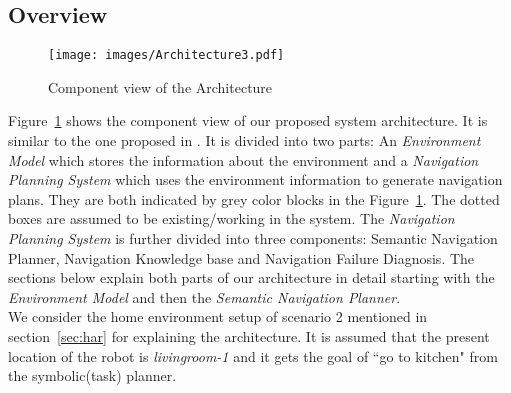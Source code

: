 \subsection{Overview} 
\begin{figure}[htbp] %
   \centering
   \texttt{[image: images/Architecture3.pdf]} 
   \caption{Component view of the Architecture}
   \label{fig:SysArc}
\end{figure}

Figure~\ref{fig:SysArc} shows the component view of our proposed system architecture. It is similar to the one proposed in \cite{1}.
It is divided into two parts: An \textit{Environment Model} which stores the information about the environment and a \textit{Navigation Planning System} 
which uses the environment information to generate navigation plans.
They are both indicated by grey color blocks in the Figure~\ref{fig:SysArc}. The dotted boxes are assumed to be existing/working in the system. 
The \textit{Navigation Planning System} is further divided into three components: Semantic Navigation Planner, Navigation Knowledge base and Navigation Failure Diagnosis.
The sections below explain both parts of our architecture in detail starting with the \textit{Environment Model} and then the \textit{Semantic Navigation Planner}.\\

We consider the home environment setup of scenario 2 mentioned in section~\ref{sec:har} for explaining the architecture. 
It is assumed that the present location of the robot is \textit{livingroom-1} and it gets the goal of ``go to kitchen" from the symbolic(task) planner.  
